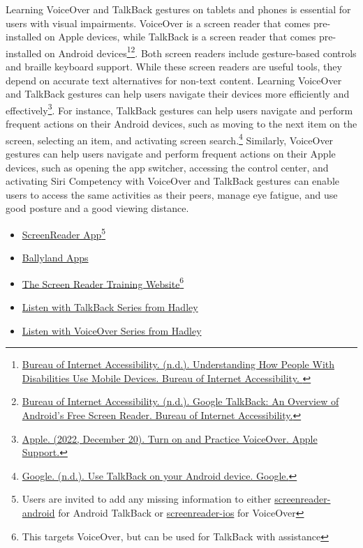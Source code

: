 Learning VoiceOver and TalkBack gestures on tablets and phones is essential for users with visual impairments. VoiceOver is a screen reader that comes pre-installed on Apple devices, while TalkBack is a screen reader that comes pre-installed on Android devices\footnote{\raggedright \href{https://www.boia.org/blog/understanding-how-people-with-disabilities-use-mobile-devices}{Bureau of Internet Accessibility. (n.d.). Understanding How People With Disabilities Use Mobile Devices. Bureau of Internet Accessibility. }}\fnsep\footnote{\raggedright \href{https://www.boia.org/blog/google-talkback-an-overview-of-androids-free-screen-reader}{Bureau of Internet Accessibility. (n.d.). Google TalkBack: An Overview of Android’s Free Screen Reader. Bureau of Internet Accessibility.}}. Both screen readers include gesture-based controls and braille keyboard support. While these screen readers are useful tools, they depend on accurate text alternatives for non-text content. Learning VoiceOver and TalkBack gestures can help users navigate their devices more efficiently and effectively\footnote{\raggedright \href{https://support.apple.com/guide/iphone/turn-on-and-practice-voiceover-iph3e2e415f/ios}{Apple. (2022, December 20). Turn on and Practice VoiceOver. Apple Support.}}. For instance, TalkBack gestures can help users navigate and perform frequent actions on their Android devices, such as moving to the next item on the screen, selecting an item, and activating screen search.\footnote{\raggedright \href{https://support.google.com/accessibility/android/answer/6151827?hl=en}{Google. (n.d.). Use TalkBack on your Android device. Google.}} Similarly, VoiceOver gestures can help users navigate and perform frequent actions on their Apple devices, such as opening the app switcher, accessing the control center, and activating Siri Competency with VoiceOver and TalkBack gestures can enable users to access the same activities as their peers, manage eye fatigue, and use good posture and a good viewing distance.

\begin{itemize}[leftmargin=*]
	\item \href{https://screenreader.app/}{ScreenReader App}\footnote{\raggedright Users are invited to add any missing information to either \href{https://github.com/appt-org/screenreader-android}{screenreader-android} for Android TalkBack or \href{https://github.com/appt-org/screenreader-ios}{screenreader-ios} for VoiceOver}
	\item \href{https://www.sonokids.org/ballyland-early-learning/ballyland-game-apps/}{Ballyland Apps}
	\item \href{https://srt.csb-cde.ca.gov/}{The Screen Reader Training Website}\footnote{\raggedright This targets VoiceOver, but can be used for TalkBack with assistance}
	\item \href{https://hadley.edu/workshops/listen-with-talkback-series}{Listen with TalkBack Series from Hadley}
	\item \href{https://hadley.edu/workshops/listen-with-voiceover-series}{Listen with VoiceOver Series from Hadley}
\end{itemize}

